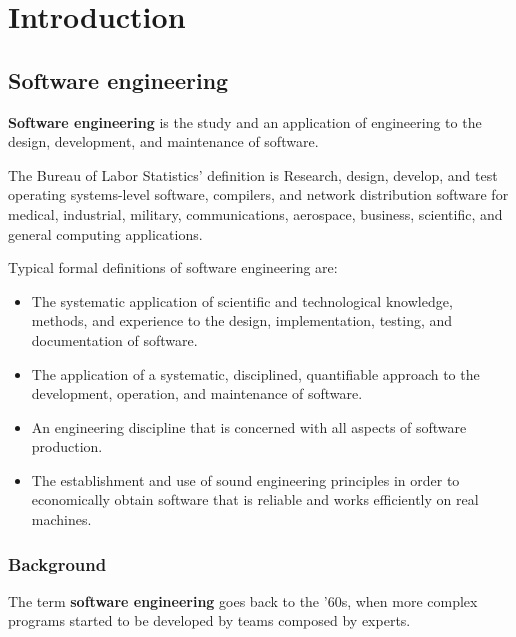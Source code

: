 \documentclass[12pt]{report}
\renewcommand\emph{\textbf}
\begin{document}
            \section{Introduction}

                \subsection{Software engineering}

                    \emph{Software engineering} is the study and an application of engineering to the design, development, and maintenance of software.

                    The Bureau of Labor Statistics' definition is Research, design, develop, and test operating systems-level software, compilers, and network distribution software for medical, industrial, military, communications, aerospace, business, scientific, and general computing applications.

                    Typical formal definitions of software engineering are:

                    \begin{itemize}
                        \item The systematic application of scientific and technological knowledge, methods, and experience to the design, implementation, testing, and documentation of software.
                        \item The application of a systematic, disciplined, quantifiable approach to the development, operation, and maintenance of software.
                        \item An engineering discipline that is concerned with all aspects of software production.
                        \item The establishment and use of sound engineering principles in order to economically obtain software that is reliable and works efficiently on real machines.
                    \end{itemize}   

                    \subsubsection{Background}

                        The term \emph{software engineering} goes back to the '60s, when more complex programs started to be developed by teams composed by experts.
\end{document}
